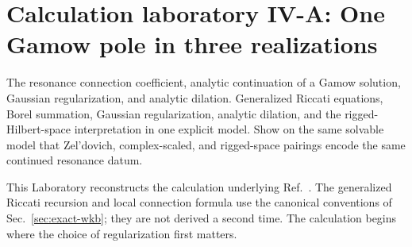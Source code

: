 \section{Calculation laboratory IV-A: One Gamow pole in three realizations}
\label{lab:2505_02301}

\calculationroute
  {The resonance connection coefficient, analytic continuation of a Gamow solution, Gaussian regularization, and analytic dilation.}
  {Generalized Riccati equations, Borel summation, Gaussian regularization, analytic dilation, and the rigged-Hilbert-space interpretation in one explicit model.}
  {Show on the same solvable model that Zel'dovich, complex-scaled, and rigged-space pairings encode the same continued resonance datum.}

This Laboratory reconstructs the calculation underlying
Ref.~\cite{Morikawa:2025xjq}.  The generalized Riccati recursion and local
connection formula use the canonical conventions of Sec.~\ref{sec:exact-wkb};
they are not derived a second time.  The calculation begins where the choice
of regularization first matters.

